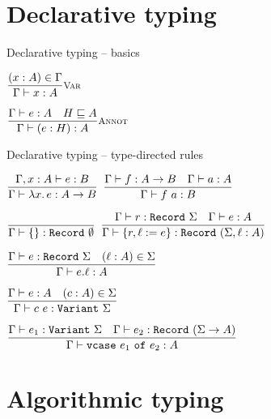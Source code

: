 \documentclass{beamer}
\begin{document}
\section{Declarative typing}

\begin{frame}{Declarative typing -- basics}

\begin{center}
  $\infrule[Var]{\sidecond{(x : A) \in \Gamma}}{\typing{x}{A}}$

  \vspace{2em}

  $\infrule[Annot]{\typing{e}{A} \quad \sidecond{\hintorder{H}{A}}}{\typing{\annot{e}{H}}{A}}$
\end{center}

\end{frame}

\begin{frame}{Declarative typing -- type-directed rules}

\begin{center}
  $\infrule{\typing[\extend{\Gamma}{x}{A}]{e}{B}}{\typing{\fun{x}{e}}{\Fun{A}{B}}}$ \quad
  $\infrule{\typing{f}{\Fun{A}{B}} \quad \typing{a}{A}}{\typing{\app{f}{a}}{B}}$

  \vspace{2em}

  $\infrule{}{\typing{\emptyrecord}{\Record{\emptysig}}}$ \quad
  $\infrule{\typing{r}{\Record{\Sigma}} \quad \typing{e}{A}}{\typing{\extendrecord{r}{\ell}{e}}{\Record{(\extendsig{\Sigma}{\ell}{A})}}}$

  \vspace{2em}

  $\infrule{\typing{e}{\Record{\Sigma}} \quad \sidecond{(\ell : A) \in \Sigma}}{\typing{\proj{e}{\ell}}{A}}$

  \vspace{2em}

  $\infrule{\typing{e}{A} \quad \sidecond{(c : A) \in \Sigma}}{\typing{\cons{c}{e}}{\Variant{\Sigma}}}$

  \vspace{2em}

  $\infrule{\typing{e_1}{\Variant{\Sigma}} \quad \typing{e_2}{\Record{(\funsig{\Sigma}{A})}}}{\typing{\vcase{e_1}{e_2}}{A}}$
\end{center}

\end{frame}

\section{Algorithmic typing}
\end{document}
